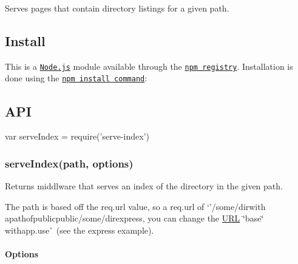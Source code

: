 \href{https://npmjs.org/package/serve-index}{\tt } \href{https://npmjs.org/package/serve-index}{\tt } \href{https://travis-ci.org/expressjs/serve-index}{\tt } \href{https://ci.appveyor.com/project/dougwilson/serve-index}{\tt } \href{https://coveralls.io/r/expressjs/serve-index?branch=master}{\tt } \href{https://www.gratipay.com/dougwilson/}{\tt }

Serves pages that contain directory listings for a given path.

\subsection*{Install}

This is a \href{https://nodejs.org/en/}{\tt Node.\+js} module available through the \href{https://www.npmjs.com/}{\tt npm registry}. Installation is done using the \href{https://docs.npmjs.com/getting-started/installing-npm-packages-locally}{\tt {\ttfamily npm install} command}\+:




\subsection*{A\+PI}


\begin{DoxyCode}
var serveIndex = require('serve-index')
\end{DoxyCode}


\subsubsection*{serve\+Index(path, options)}

Returns middlware that serves an index of the directory in the given {\ttfamily path}.

The {\ttfamily path} is based off the {\ttfamily req.\+url} value, so a {\ttfamily req.\+url} of `'/some/dir{\ttfamily  with a}path{\ttfamily of}\textquotesingle{}public\textquotesingle{}public/some/direxpress{\ttfamily , you can change the \mbox{\hyperlink{namespace_u_r_l}{U\+RL}} \char`\"{}base\char`\"{} with}app.\+use\`{} (see the express example).

\paragraph*{Options}

